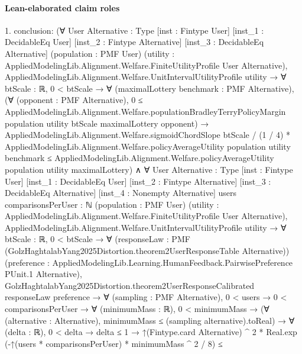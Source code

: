\documentclass[10pt]{article}
\begin{document}
\paragraph{Lean-elaborated claim roles}\begin{ReviewVerbatim}
1. conclusion: (∀ {User Alternative : Type} [inst : Fintype User] [inst_1 : DecidableEq User] [inst_2 : Fintype Alternative]
    [inst_3 : DecidableEq Alternative] (population : PMF User)
    (utility : AppliedModelingLib.Alignment.Welfare.FiniteUtilityProfile User Alternative),
    AppliedModelingLib.Alignment.Welfare.UnitIntervalUtilityProfile utility →
      ∀ {btScale : ℝ},
        0 < btScale →
          ∀ (maximalLottery benchmark : PMF Alternative),
            (∀ (opponent : PMF Alternative),
                0 ≤
                  AppliedModelingLib.Alignment.Welfare.populationBradleyTerryPolicyMargin population utility btScale
                    maximalLottery opponent) →
              AppliedModelingLib.Alignment.Welfare.sigmoidChordSlope btScale / (1 / 4) *
                  AppliedModelingLib.Alignment.Welfare.policyAverageUtility population utility benchmark ≤
                AppliedModelingLib.Alignment.Welfare.policyAverageUtility population utility maximalLottery) ∧
  ∀ {User Alternative : Type} [inst : Fintype User] [inst_1 : DecidableEq User] [inst_2 : Fintype Alternative]
    [inst_3 : DecidableEq Alternative] [inst_4 : Nonempty Alternative] {users comparisonsPerUser : ℕ}
    (population : PMF User) (utility : AppliedModelingLib.Alignment.Welfare.FiniteUtilityProfile User Alternative),
    AppliedModelingLib.Alignment.Welfare.UnitIntervalUtilityProfile utility →
      ∀ {btScale : ℝ},
        0 < btScale →
          ∀ (responseLaw : PMF (GolzHaghtalabYang2025Distortion.theorem2UserResponseTable Alternative))
            (preference : AppliedModelingLib.Learning.HumanFeedback.PairwisePreference PUnit.{1} Alternative),
            GolzHaghtalabYang2025Distortion.theorem2UserResponseCalibrated responseLaw preference →
              ∀ (sampling : PMF Alternative),
                0 < users →
                  0 < comparisonsPerUser →
                    ∀ (minimumMass : ℝ),
                      0 < minimumMass →
                        (∀ (alternative : Alternative), minimumMass ≤ (sampling alternative).toReal) →
                          ∀ (delta : ℝ),
                            0 < delta →
                              delta ≤ 1 →
                                ↑(Fintype.card Alternative) ^ 2 *
                                      Real.exp (-↑(users * comparisonsPerUser) * minimumMass ^ 2 / 8) ≤

\end{ReviewVerbatim}
\end{document}
